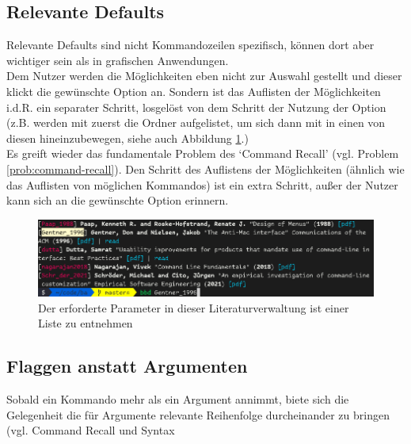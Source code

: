 \documentclass[oneside,bibliography=totocnumbered,BCOR=5mm]{scrbook}
\begin{document}
\subsection{Relevante Defaults}

Relevante Defaults sind nicht Kommandozeilen spezifisch, können dort aber
wichtiger sein als in grafischen Anwendungen.
\\
Dem Nutzer werden die Möglichkeiten eben nicht zur Auswahl gestellt und dieser
klickt die gewünschte Option an. Sondern ist das Auflisten der Möglichkeiten
i.d.R. ein separater Schritt, losgelöst von dem Schritt der Nutzung der Option
(z.B. werden mit  zuerst die Ordner aufgelistet, um sich dann
mit  in einen von diesen hineinzubewegen, siehe auch Abbildung \ref{fig:defaults-demo}.)
\\
Es greift wieder das fundamentale Problem des `Command Recall' (vgl. Problem
\ref{prob:command-recall}). Den Schritt des Auflistens der Möglichkeiten
(ähnlich wie das Auflisten von möglichen Kommandos) ist ein extra Schritt, außer
der Nutzer kann sich an die gewünschte Option erinnern.

\begin{figure}
  \centering
  \includegraphics[scale=0.5]{defaults-demo.png}
  \caption{Der erforderte Parameter in dieser Literaturverwaltung ist einer Liste zu entnehmen}
  \label{fig:defaults-demo}
\end{figure}

\bigskip



\subsection{Flaggen anstatt Argumenten}

Sobald ein Kommando mehr als ein Argument annimmt, biete sich die Gelegenheit
die für Argumente relevante Reihenfolge durcheinander zu bringen (vgl. Command
Recall und Syntax %
\end{document}
